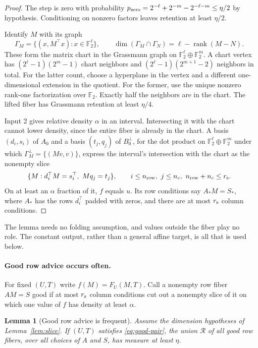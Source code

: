 \documentclass[11pt]{article}
\newtheorem{lemma}[theorem]{Lemma}
\newcommand{\F}{\mathbb F}
\newcommand{\rank}{\operatorname{rank}}
\begin{document}
\begin{proof}
The step is zero with probability
$p_{\rm zero}=2^{-\ell}+2^{-m}-2^{-\ell-m}\le\eta/2$ by hypothesis.
Conditioning on nonzero factors leaves retention at least $\eta/2$.

Identify $M$ with its graph
\[
 \Gamma_M=\{(x,M^\top x):x\in\F_2^\ell\},\qquad
 \dim(\Gamma_M\cap \Gamma_N)=\ell-\rank(M-N).
\]
These form the matrix chart in the Grassmann graph on
$\F_2^\ell\oplus\F_2^m$. A chart vertex has
$(2^\ell-1)(2^m-1)$ chart neighbors and
$(2^\ell-1)(2^{m+1}-2)$ neighbors in total. For the latter count, choose
a hyperplane in the vertex and a different one-dimensional extension in
the quotient. For the former, use the unique nonzero rank-one
factorization over $\F_2$. Exactly half the neighbors are in the chart.
The lifted fiber has Grassmann retention at least $\eta/4$.

Input 2 gives relative density $\alpha$ in an interval. Intersecting it
with the chart cannot lower density, since the entire fiber is already
in the chart. A basis $(d_i,s_i)$ of $A_0$ and a basis $(t_j,q_j)$ of
$B_0^\perp$, for the dot product on $\F_2^\ell\oplus\F_2^m$ under which
$\Gamma_M^\perp=\{(Mv,v)\}$, express the interval's intersection with the
chart as the
nonempty slice
\begin{equation}\label{eq:slice}
 \{M:d_i^\top M=s_i^\top,\ Mq_j=t_j\},
 \qquad i\le n_{\rm row},\ j\le n_c,\ n_{\rm row}+n_c\le r_{\rm s}.
\end{equation}
On at least an $\alpha$ fraction of it, $f$ equals $u$. Its row
conditions say $A_*M=S_*$, where $A_*$ has the rows $d_i^\top$ padded with
zeros, and there are at most $r_{\rm s}$ column conditions.
\end{proof}

The lemma needs no folding assumption, and values outside the fiber play
no role. The constant output, rather than a general affine target, is all
that is used below.

\paragraph{Good row advice occurs often.}
For fixed $(U,T)$ write $f(M)=F_U(M,T)$. Call a nonempty row fiber $AM=S$
good if at most $r_{\rm s}$ column conditions cut out a nonempty slice of it
on which one value of $f$ has density at least $\alpha$.

\begin{lemma}[Good row advice is frequent]\label{lem:advice}
Assume the dimension hypotheses of Lemma~\ref{lem:slice}. If $(U,T)$
satisfies \eqref{eq:good-pair}, the union $\mathcal R$ of all good
row fibers, over all choices of $A$ and $S$, has measure at least $\eta$.
\end{lemma}
\end{document}
